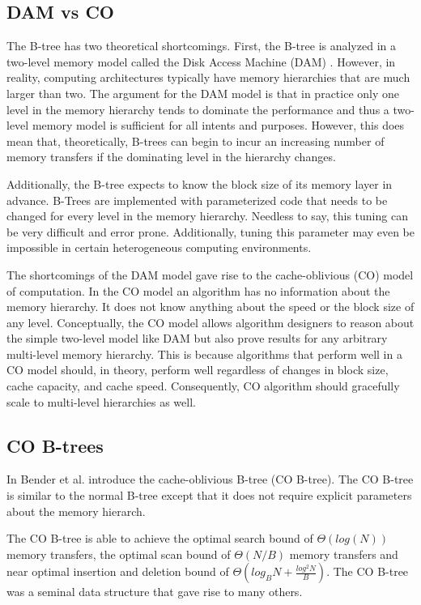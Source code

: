 \documentclass{style}
\begin{document}
\subsection{DAM vs CO}

The B-tree has two theoretical shortcomings. First, the B-tree is analyzed in
a two-level memory model called the Disk Access Machine (DAM) \cite{Aggarwal}.
However, in reality, computing architectures typically have memory hierarchies
that are much larger than two. The argument for the DAM model is that in
practice only one level in the memory hierarchy tends to dominate the
performance and thus a two-level memory model is sufficient for all intents
and purposes. However, this does mean that, theoretically, B-trees can begin
to incur an increasing number of memory transfers if the dominating level in
the hierarchy changes.

Additionally, the B-tree expects to know the block size of its memory layer in
advance. B-Trees are implemented with parameterized code that needs to be
changed for every level in the memory hierarchy. Needless to say, this tuning
can be very difficult and error prone. Additionally, tuning this parameter may
even be impossible in certain heterogeneous computing environments.

The shortcomings of the DAM model gave rise to the cache-oblivious (CO) model
of computation. In the CO model an algorithm has no information about the
memory hierarchy. It does not know anything about the speed or the block size
of any level. Conceptually, the CO model allows algorithm designers to reason
about the simple two-level model like DAM but also prove results for any
arbitrary multi-level memory hierarchy. This is because algorithms that
perform well in a CO model should, in theory, perform well regardless of
changes in block size, cache capacity, and cache speed. Consequently, CO
algorithm should gracefully scale to multi-level hierarchies as well.

\subsection{CO B-trees}

In \cite{BenderDemainColton} Bender et al. introduce the cache-oblivious
B-tree (CO B-tree). The CO B-tree is similar to the normal B-tree except that
it does not require explicit parameters about the memory hierarch.

The CO B-tree is able to achieve the optimal search bound of $\Theta(log(N))$
memory transfers, the optimal scan bound of $\Theta(N/B)$ memory transfers and
near optimal insertion and deletion bound of $\Theta(log_B N +
\frac{log^2{N}}{B})$. The CO B-tree was a seminal data structure that gave
rise to many others.
\end{document}
